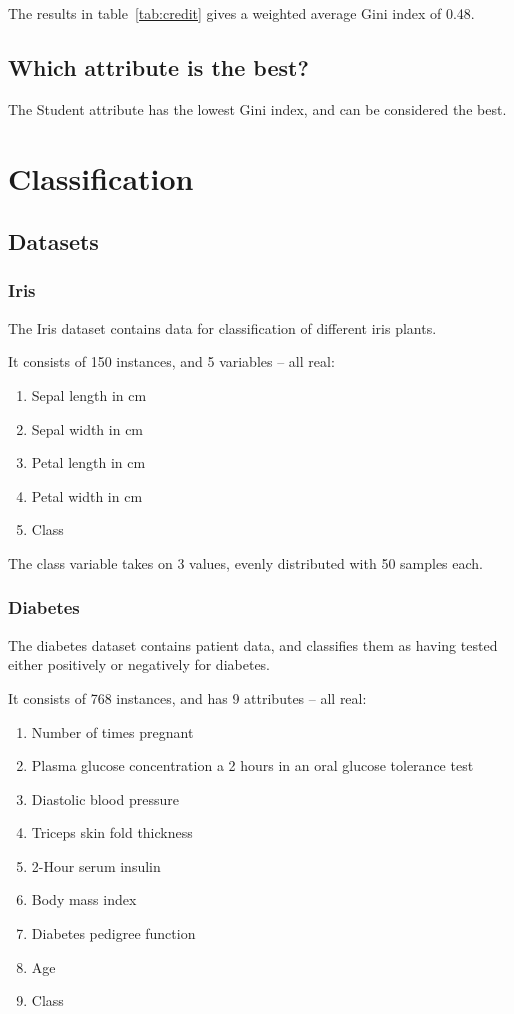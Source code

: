 \documentclass[11pt,a4paper]{article}
\begin{document}
The results in table~\ref{tab:credit} gives a weighted average Gini index of 0.48.

\subsection{Which attribute is the best?}

The Student attribute has the lowest Gini index, and can be considered the best.

\section{Classification} %
\label{sec:classification}

\setcounter{subsection}{1}

\subsection{Datasets}

\subsubsection*{Iris}

The Iris dataset contains data for classification of different iris plants.

It consists of 150 instances, and 5 variables -- all real:

\begin{enumerate}
  \item Sepal length in cm
  \item Sepal width in cm
  \item Petal length in cm
  \item Petal width in cm
  \item Class
\end{enumerate}

The class variable takes on 3 values, evenly distributed with 50 samples each.

\subsubsection*{Diabetes}

The diabetes dataset contains patient data, and classifies them as having tested either positively or negatively for diabetes.

It consists of 768 instances, and has 9 attributes -- all real:

\begin{enumerate}
  \item Number of times pregnant
  \item Plasma glucose concentration a 2 hours in an oral glucose tolerance test
  \item Diastolic blood pressure
  \item Triceps skin fold thickness
  \item 2-Hour serum insulin
  \item Body mass index
  \item Diabetes pedigree function
  \item Age
  \item Class
\end{enumerate}
\end{document}
